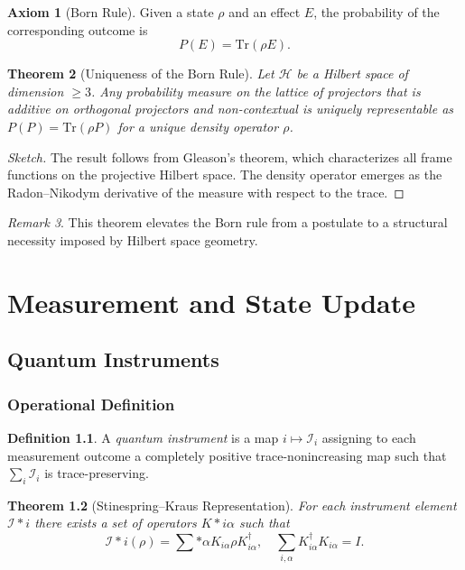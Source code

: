 \documentclass[12pt]{book}
\theoremstyle{plain}
\newtheorem{theorem}{Theorem}[chapter]
\theoremstyle{definition}
\newtheorem{definition}[theorem]{Definition}
\newtheorem{axiom}[theorem]{Axiom}
\theoremstyle{remark}
\newtheorem{remark}[theorem]{Remark}
\begin{document}
\begin{axiom}[Born Rule]
Given a state $\rho$ and an effect $E$, the probability of the corresponding outcome is
\[
P(E) = \mathrm{Tr}(\rho E).
\]
\end{axiom}

\begin{theorem}[Uniqueness of the Born Rule]
Let $\mathcal{H}$ be a Hilbert space of dimension $\geq 3$. Any probability measure on the lattice of projectors that is additive on orthogonal projectors and non-contextual is uniquely representable as $P(P)=\mathrm{Tr}(\rho P)$ for a unique density operator $\rho$.
\end{theorem}

\begin{proof}[Sketch]
The result follows from Gleason's theorem, which characterizes all frame functions on the projective Hilbert space. The density operator emerges as the Radon--Nikodym derivative of the measure with respect to the trace.
\end{proof}

\begin{remark}
This theorem elevates the Born rule from a postulate to a structural necessity imposed by Hilbert space geometry.
\end{remark}

\part{Measurement and State Update}

\chapter{Quantum Instruments}

\section{Operational Definition}

\begin{definition}
A \emph{quantum instrument} is a map $i \mapsto \mathcal{I}_i$ assigning to each measurement outcome a completely positive trace-nonincreasing map such that $\sum_i \mathcal{I}_i$ is trace-preserving.
\end{definition}

\begin{theorem}[Stinespring--Kraus Representation]
For each instrument element $\mathcal{I}*i$ there exists a set of operators ${K*{i\alpha}}$ such that
\[
\mathcal{I}*i(\rho)=\sum*\alpha K_{i\alpha}\rho K_{i\alpha}^\dagger,
\quad
\sum_{i,\alpha} K_{i\alpha}^\dagger K_{i\alpha}=I.
\]
\end{theorem}
\end{document}
